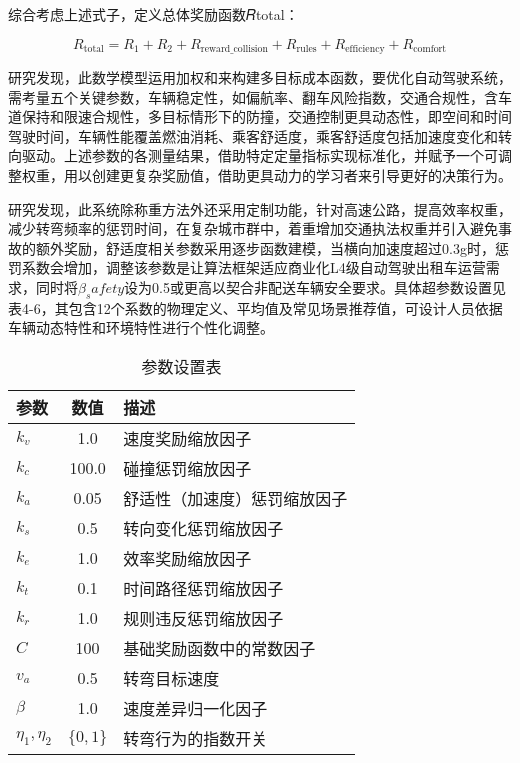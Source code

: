 综合考虑上述式子，定义总体奖励函数𝑅total：

\begin{equation}
	R_{\text{total}} = R_1 + R_2 + R_{\text{reward\_collision}} + R_{\text{rules}} + R_{\text{efficiency}} + R_{\text{comfort}}
\end{equation}

研究发现，此数学模型运用加权和来构建多目标成本函数，要优化自动驾驶系统，需考量五个关键参数，车辆稳定性，如偏航率、翻车风险指数，交通合规性，含车道保持和限速合规性，多目标情形下的防撞，交通控制更具动态性，即空间和时间驾驶时间，车辆性能覆盖燃油消耗、乘客舒适度，乘客舒适度包括加速度变化和转向驱动。上述参数的各测量结果，借助特定定量指标实现标准化，并赋予一个可调整权重，用以创建更复杂奖励值，借助更具动力的学习者来引导更好的决策行为。

研究发现，此系统除称重方法外还采用定制功能，针对高速公路，提高效率权重，减少转弯频率的惩罚时间，在复杂城市群中，着重增加交通执法权重并引入避免事故的额外奖励，舒适度相关参数采用逐步函数建模，当横向加速度超过0.3g时，惩罚系数会增加，调整该参数是让算法框架适应商业化L4级自动驾驶出租车运营需求，同时将\(β_safety\)设为0.5或更高以契合非配送车辆安全要求。具体超参数设置见表4-6，其包含12个系数的物理定义、平均值及常见场景推荐值，可设计人员依据车辆动态特性和环境特性进行个性化调整。

\begin{table}[htbp]
	\centering
	\caption{参数设置表}
	\label{tab:parameters}
	\begin{tabular}{lcl}
		\toprule
		\textbf{参数} & \textbf{数值} & \textbf{描述} \\
		\midrule
		\( k_v \)     & 1.0     & 速度奖励缩放因子 \\
		\( k_c \)     & 100.0   & 碰撞惩罚缩放因子 \\
		\( k_a \)     & 0.05    & 舒适性（加速度）惩罚缩放因子 \\
		\( k_s \)     & 0.5     & 转向变化惩罚缩放因子 \\
		\( k_e \)     & 1.0     & 效率奖励缩放因子 \\
		\( k_t \)     & 0.1     & 时间路径惩罚缩放因子 \\
		\( k_r \)     & 1.0     & 规则违反惩罚缩放因子 \\
		\( C \)       & 100     & 基础奖励函数中的常数因子 \\
		\( v_a \)     & 0.5     & 转弯目标速度 \\
		\(\beta\)    & 1.0     & 速度差异归一化因子 \\
		\(\eta_1, \eta_2\) & \(\{0, 1\}\) & 转弯行为的指数开关 \\
		\bottomrule
	\end{tabular}
\end{table}


